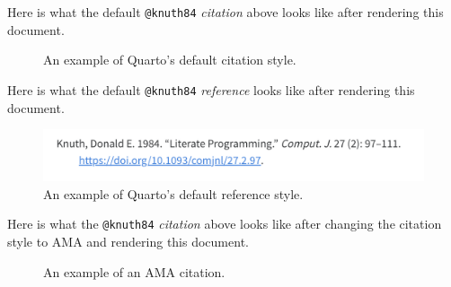\documentclass[
  letterpaper,
  DIV=11,
  numbers=noendperiod]{scrreprt}
\begin{document}
Here is what the default \texttt{@knuth84} \emph{citation} above looks
like after rendering this document.

\begin{figure}


\caption{\label{fig-default-citation}An example of Quarto's default
citation style.}

\end{figure}%

Here is what the default \texttt{@knuth84} \emph{reference} looks like
after rendering this document.

\begin{figure}[H]

{\centering \includegraphics{chapters/cross_references/default_reference.png}

}

\caption{An example of Quarto's default reference style.}

\end{figure}%

Here is what the \texttt{@knuth84} \emph{citation} above looks like
after changing the citation style to AMA and rendering this document.

\begin{figure}


\caption{\label{fig-ama-citation}An example of an AMA citation.}

\end{figure}%
\end{document}
